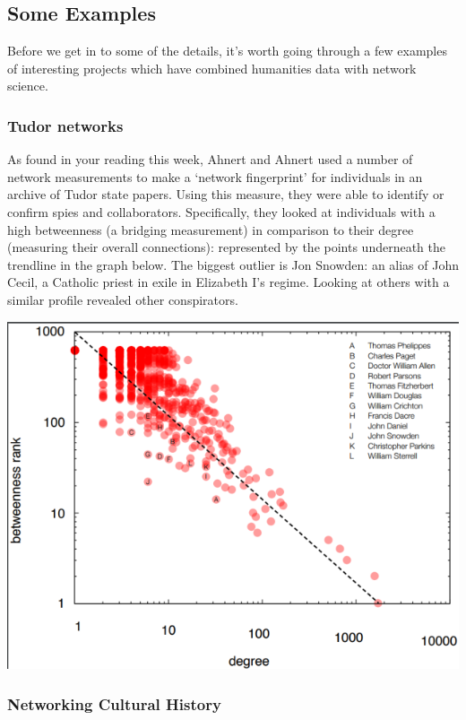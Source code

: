 \documentclass[
]{book}
\begin{document}
\hypertarget{some-examples}{%
\subsection{Some Examples}\label{some-examples}}

Before we get in to some of the details, it's worth going through a few examples of interesting projects which have combined humanities data with network science.

\hypertarget{tudor-networks}{%
\subsubsection{Tudor networks}\label{tudor-networks}}

As found in your reading this week, Ahnert and Ahnert used a number of network measurements to make a `network fingerprint' for individuals in an archive of Tudor state papers. Using this measure, they were able to identify or confirm spies and collaborators. Specifically, they looked at individuals with a high betweenness (a bridging measurement) in comparison to their degree (measuring their overall connections): represented by the points underneath the trendline in the graph below. The biggest outlier is Jon Snowden: an alias of John Cecil, a Catholic priest in exile in Elizabeth I's regime. Looking at others with a similar profile revealed other conspirators.

\includegraphics{images/Screenshot 2022-10-03 at 11.42.11.png}

\hypertarget{networking-cultural-history}{%
\subsubsection{Networking Cultural History}\label{networking-cultural-history}}
\end{document}
